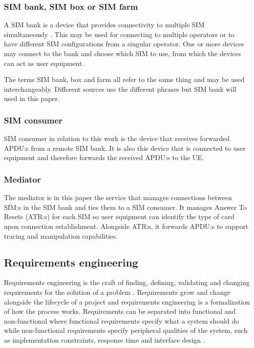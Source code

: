 \subsubsection{SIM bank, SIM box or SIM farm}

A SIM bank is a device that provides connectivity to multiple SIM
simultaneously \cite{hyprms-sim-bank}. This may be used for
connecting to multiple operators or to have different SIM
configurations from a singular operator. One or more devices may
connect to the bank and choose which SIM to use, from which the
devices can act as user equipment.

The terms SIM bank, box and farm all refer to the same thing and
may be used interchangeably. Different sources use the different
phrases but SIM bank will used in this paper.

\subsubsection{SIM consumer}

SIM consumer in relation to this work is the device that receives
forwarded APDU:s from a remote SIM bank. It is also this device
that is connected to user equipment and therefore forwards the
received APDU:s to the UE.

\subsubsection{Mediator}

The mediator is in this paper the service that manages connections
between SIM:s in the SIM bank and ties them to a SIM consumer. It
manages Answer To Resets (ATR:s) for each SIM so user equipment
can identify the type of card upon connection establishment.
Alongside ATR:s, it forwards APDU:s to support tracing and
manipulation capabilities.

\subsection{Requirements engineering}

Requirements engineering is the craft of finding, defining,
validating and changing requirements for the solution of a problem \cite[111]{sommerville-software-engineering}.
Requirements grow and change alongside the lifecycle of a project
and requirements engineering is a formalization of how the process
works. Requirements can be separated into functional and
non-functional where functional requirements specify what a system
should do \cite[105-107]{sommerville-software-engineering} while
non-functional requirements specify peripheral qualities of the
system, such as implementation constraints, response time and
interface design \cite[107-111]{sommerville-software-engineering}.


